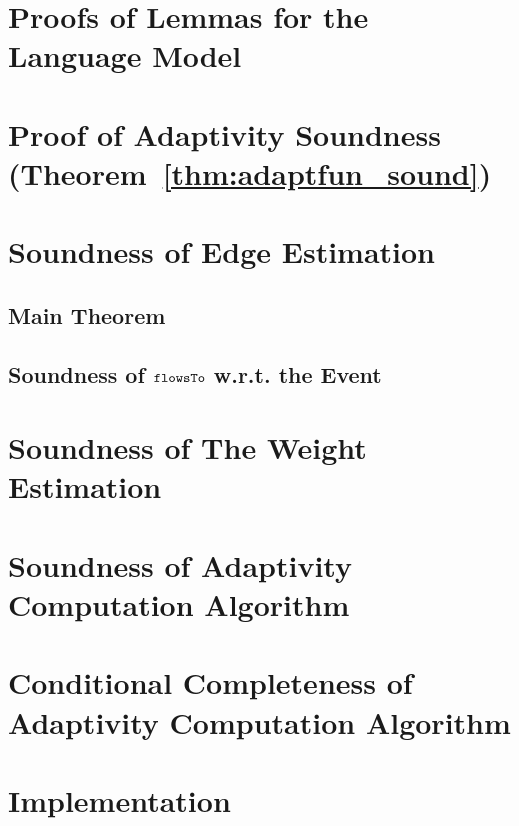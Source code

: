 \section{Proofs of Lemmas for the Language Model}
\label{apdx:lemma_sec123}


\section{Proof of Adaptivity Soundness (Theorem~\ref{thm:adaptfun_sound})}
\label{apdx:adapt_soundness}

\clearpage
\section{Soundness of Edge Estimation}
\label{apdx:flowsto_soundness}
\subsection{Main Theorem}

%
\subsection{Soundness of $\mathtt{flowsTo}$ w.r.t. the Event}
\label{apdx:flowsto_event_soundness}

\clearpage
\section{Soundness of The Weight Estimation}
\label{apdx:reachability_soundness}

\clearpage
\section{Soundness of Adaptivity Computation Algorithm}
\label{apdx:adaptalg_soundness}

\section{Conditional Completeness of Adaptivity Computation Algorithm}
\label{apdx:adaptalg_completeness}


\section{Implementation}
\label{appendix:implementation}
